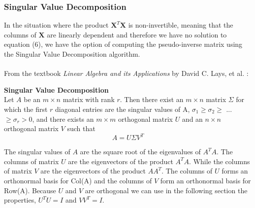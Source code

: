 \documentclass[oneside,10pt]{article}
\newcommand{\X}{\mathbf{X}}
\begin{document}
\subsubsection{Singular Value Decomposition}
In the situation where the product $\X^{T}\X$ is non-invertible, meaning that the columns of $\X$ are linearly dependent and therefore we have no solution to equation (6), we have the option of computing the pseudo-inverse matrix using the Singular Value Decomposition algorithm.\\
\\
From the textbook \textit{Linear Algebra and its Applications} by David C. Lays, et al. \cite{linalg}:
\begin{tcolorbox}[colback=blue!8]
\textbf{Singular Value Decomposition}\\
Let $A$ be an $m \times n$ matrix with rank $r$. Then there exist an $m \times n$ matrix $\Sigma$ for which the first $r$ diagonal entries are the singular values of A, $\sigma_{1} \geq \sigma_{2} \geq$ ... $\geq \sigma_{r} > 0$, and there exists an $m \times m$ orthogonal matrix $U$ and an $n\times n$ orthogonal matrix $V$ such that 
$$
A = U\Sigma V^{T}
$$
\end{tcolorbox}
\noindent The singular values of $A$ are the square root of the eigenvalues of $A^{T}A$. The columns of matrix $U$ are the eigenvectors of the product $A^{T}A$. While the columns of matrix $V$ are the eigenvectors of the product $AA^{T}$. The columns of $U$ forms an orthonormal basis for Col(A) and the columns of $V$ form an orthonormal basis for Row(A). Because $U$ and $V$ are orthogonal we can use in the following section the properties, $U^{T}U=I$ and $VV^{T}=I$.
\end{document}
